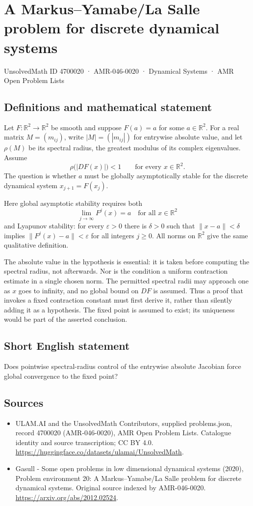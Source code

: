\documentclass[11pt,a4paper]{article}
\begin{document}
\section*{A Markus–Yamabe/La Salle problem for discrete dynamical systems}\label{4700020}
{\small UnsolvedMath ID 4700020 · AMR-046-0020 · Dynamical Systems · AMR Open Problem Lists}
\subsection{Definitions and mathematical statement}
Let $F:\mathbb R^2\to\mathbb R^2$ be smooth and suppose $F(a)=a$ for some
$a\in\mathbb R^2$. For a real matrix $M=(m_{ij})$, write $|M|=(|m_{ij}|)$
for entrywise absolute value, and let $\rho(M)$ be its spectral radius,
the greatest modulus of its complex eigenvalues. Assume
\[
 \rho\bigl(|DF(x)|\bigr)<1\qquad\text{for every }x\in\mathbb R^2.
\]
The question is whether $a$ must be globally asymptotically stable for the
discrete dynamical system $x_{j+1}=F(x_j)$.

Here global asymptotic stability requires both
\[
 \lim_{j\to\infty}F^j(x)=a\quad\text{for all }x\in\mathbb R^2
\]
and Lyapunov stability: for every $\varepsilon>0$ there is $\delta>0$ such
that $\|x-a\|<\delta$ implies $\|F^j(x)-a\|<\varepsilon$ for all
integers $j\ge0$. All norms on $\mathbb R^2$ give the same qualitative
definition.

The absolute value in the hypothesis is essential: it is taken before
computing the spectral radius, not afterwards. Nor is the condition a
uniform contraction estimate in a single chosen norm. The permitted
spectral radii may approach one as $x$ goes to infinity, and no global
bound on $DF$ is assumed. Thus a proof that invokes a fixed contraction
constant must first derive it, rather than silently adding it as a
hypothesis. The fixed point is assumed to exist; its uniqueness would be
part of the asserted conclusion.
\subsection{Short English statement}
Does pointwise spectral-radius control of the entrywise absolute Jacobian force global convergence to the fixed point?
\subsection{Sources}
\begin{itemize}
\item[S1] ULAM.AI and the UnsolvedMath Contributors, supplied problems.json, record 4700020 (AMR-046-0020), AMR Open Problem Lists. Catalogue identity and source transcription; CC BY 4.0.
\url{https://huggingface.co/datasets/ulamai/UnsolvedMath}.
\item[S2] Gasull - Some open problems in low dimensional dynamical systems (2020), Problem environment 20: A Markus–Yamabe/La Salle problem for discrete dynamical systems. Original source indexed by AMR-046-0020.
\url{https://arxiv.org/abs/2012.02524}.
\end{itemize}
\end{document}
